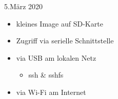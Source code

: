 \documentclass{beamer}
\begin{document}
\begin{frame}{5.März 2020}
 \begin{itemize}
  \item \targetS kleines Image auf SD-Karte
  \item Zugriff via serielle Schnittstelle
  \item via USB am lokalen Netz
  \begin{itemize}
    \item ssh \& sshfs
  \end{itemize}
  \item via Wi-Fi am Internet
 \end{itemize}
\end{frame}
%
%
%
\end{document}

